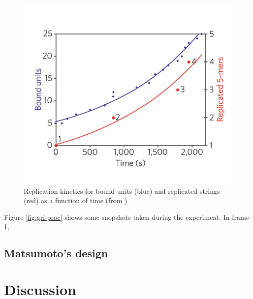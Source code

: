 \documentclass[12pt,twoside]{article}
\theoremstyle{plain}
\theoremstyle{definition}
\theoremstyle{remark}
\begin{document}
\begin{figure}[thbp]
	 \centerline{\includegraphics[width=.4\textwidth]{griffith}}
	 {\caption{ Replication kinetics for bound units (blue) and replicated strings (red) as a function of time (from \cite{griffith_self-replication_2005})}
	 \label{fig:gri-expo}}
\end{figure}

Figure \ref{fig:gri-proc} shows some snopshots taken during the experiment. In frame 1, 


\subsection{Matsumoto's design}

\section{Discussion}
\label{sec:discuss}


%
%



\end{document}
